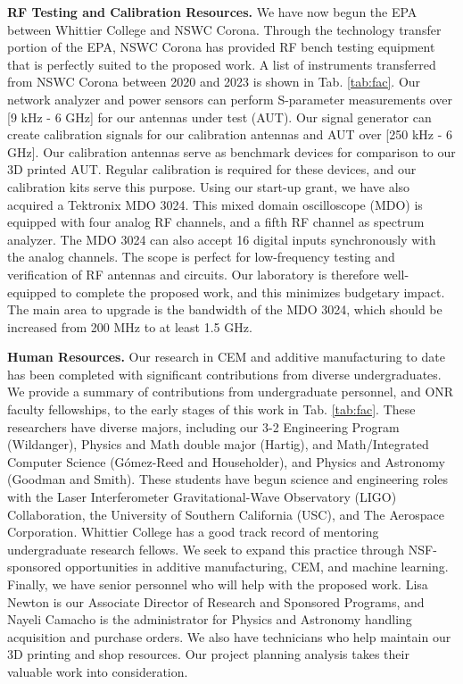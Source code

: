 \documentclass[10pt]{amsart}
\theoremstyle{definition}
\numberwithin{equation}{section}
\begin{document}
\textbf{RF Testing and Calibration Resources.}  We have now begun the EPA between Whittier College and NSWC Corona.  Through the technology transfer portion of the EPA, NSWC Corona has provided RF bench testing equipment that is perfectly suited to the proposed work.  A list of instruments transferred from NSWC Corona between 2020 and 2023 is shown in Tab. \ref{tab:fac}.  Our network analyzer and power sensors can perform S-parameter measurements over [9 kHz - 6 GHz] for our antennas under test (AUT).  Our signal generator can create calibration signals for our calibration antennas and AUT over [250 kHz - 6 GHz].  Our calibration antennas serve as benchmark devices for comparison to our 3D printed AUT.  Regular calibration is required for these devices, and our calibration kits serve this purpose.  Using our start-up grant, we have also acquired a Tektronix MDO 3024.  This mixed domain oscilloscope (MDO) is equipped with four analog RF channels, and a fifth RF channel as spectrum analyzer.  The MDO 3024 can also accept 16 digital inputs synchronously with the analog channels.  The scope is perfect for low-frequency testing and verification of RF antennas and circuits.  Our laboratory is therefore well-equipped to complete the proposed work, and this minimizes budgetary impact.  The main area to upgrade is the bandwidth of the MDO 3024, which should be increased from 200 MHz to at least 1.5 GHz.  

\textbf{Human Resources.} Our research in CEM and additive manufacturing to date has been completed with significant contributions from diverse undergraduates.  We provide a summary of contributions from undergraduate personnel, and ONR faculty fellowships, to the early stages of this work in Tab. \ref{tab:fac}.  These researchers have diverse majors, including our 3-2 Engineering Program (Wildanger), Physics and Math double major (Hartig), and Math/Integrated Computer Science (G\'{o}mez-Reed and Householder), and Physics and Astronomy (Goodman and Smith).   These students have begun science and engineering roles with the Laser Interferometer Gravitational-Wave Observatory (LIGO) Collaboration, the University of Southern California (USC), and The Aerospace Corporation.  Whittier College has a good track record of mentoring undergraduate research fellows.  We seek to expand this practice through NSF-sponsored opportunities in additive manufacturing, CEM, and machine learning.  Finally, we have senior personnel who will help with the proposed work.  Lisa Newton is our Associate Director of Research and Sponsored Programs, and Nayeli Camacho is the administrator for Physics and Astronomy handling acquisition and purchase orders.  We also have technicians who help maintain our 3D printing and shop resources.  Our project planning analysis takes their valuable work into consideration.
\end{document}
